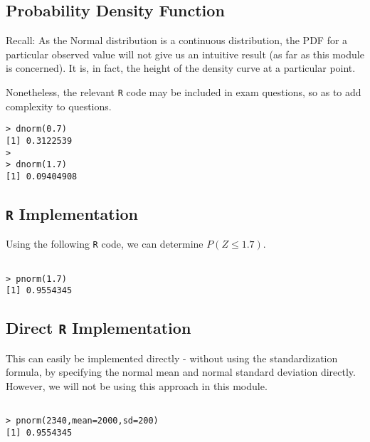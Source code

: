 \subsection{Probability Density Function}
Recall: As the Normal distribution is a continuous distribution, the PDF for a particular observed value will not give us an intuitive
result (as far as this module is concerned). It is, in fact, the height of the density curve at a particular point.

Nonetheless, the relevant \texttt{R} code may be included in exam questions, so as to add complexity to questions.

\begin{verbatim}
> dnorm(0.7)
[1] 0.3122539
>
> dnorm(1.7)
[1] 0.09404908

\end{verbatim}


\subsection{\texttt{R} Implementation}


Using the following \texttt{R} code, we can determine $P(Z \leq 1.7)$.
\begin{verbatim}

> pnorm(1.7)
[1] 0.9554345

\end{verbatim}




\subsection{Direct \texttt{R} Implementation}

This can easily be implemented directly - without using the standardization formula, by specifying the normal mean and normal standard deviation directly. However, we will not be using this approach in this module.
\begin{verbatim}

> pnorm(2340,mean=2000,sd=200)
[1] 0.9554345


\end{verbatim}
